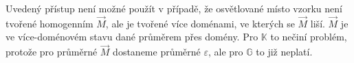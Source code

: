 Uvedený přístup není možné použít v případě, že osvětlované místo vzor\-ku není tvořené homogenním $\vec{M}$, ale je tvořené více doménami, ve kterých se $\vec{M}$ liší.
$\vec{M}$ je ve více-doménovém stavu dané průměrem přes domény.
Pro $\mathbb{K}$ to nečiní problém, protože pro průměrné $\vec{M}$ dostaneme průměrné $\varepsilon$, ale pro $\mathbb{G}$ to již neplatí.
